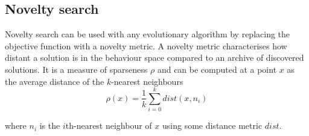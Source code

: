 \subsection{Novelty search}
Novelty search can be used with any evolutionary algorithm by replacing the objective
function with a novelty metric. A novelty metric characterises how distant a solution
is in the behaviour space compared to an archive of discovered solutions. It is a measure
of sparseness $\rho$ and can be computed at a point $x$ as the average distance of the
$k$-nearest neighbours
\[
    \rho(x) = \frac{1}{k} \sum_{i=0}^{k} dist(x, n_{i})
\]

where $n_{i}$ is the $i$th-nearest neighbour of $x$ using some distance metric $dist$.
